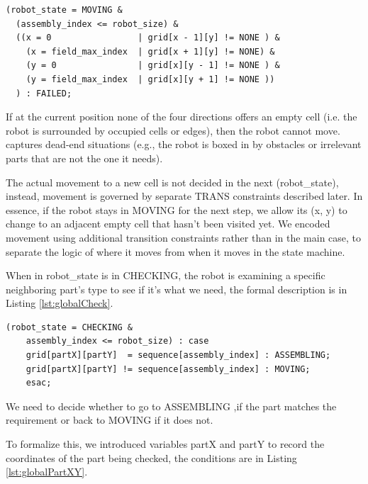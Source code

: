     \begin{lstlisting}[language=NuSMV, caption={Assign for transition MOVING to FAILED}, 
label={lse:globalMoveFail}]
  (robot_state = MOVING & 
  (assembly_index <= robot_size) & 
  ((x = 0                 | grid[x - 1][y] != NONE ) & 
    (x = field_max_index  | grid[x + 1][y] != NONE) & 
    (y = 0                | grid[x][y - 1] != NONE ) & 
    (y = field_max_index  | grid[x][y + 1] != NONE ))
  ) : FAILED;
    \end{lstlisting}

If at the current position none of the four directions offers an empty 
cell (i.e. the robot is surrounded by occupied cells or edges), then 
the robot cannot move. 
captures dead-end situations (e.g., the robot is boxed in by obstacles or 
irrelevant parts that are not the one it needs).

The actual movement to a new cell is 
not decided in the next (robot\_state), instead, movement is governed by
separate TRANS constraints described later. 
In essence, if the robot stays in MOVING for the next step, we allow 
its (x, y) to change to an adjacent empty cell that hasn’t been visited 
yet. We encoded movement using additional transition constraints rather 
than in the main case, to separate the logic of where it moves from when 
it moves in the state machine.

When in robot\_state is in CHECKING, the robot is examining a specific 
neighboring part's type to see if it's what we need, the formal description is in Listing \ref{lst:globalCheck}. 

    \begin{lstlisting}[language=NuSMV, caption={Assign for transition from CHECKING state and changing of 
        auxiliary partX and partY variables}, 
    label={lst:globalCheck}]
    (robot_state = CHECKING & 
    assembly_index <= robot_size) : case
    grid[partX][partY]  = sequence[assembly_index] : ASSEMBLING; 
    grid[partX][partY] != sequence[assembly_index] : MOVING;
    esac;
    \end{lstlisting}
We need to decide whether to go to ASSEMBLING ,if the part matches the requirement
or back to MOVING if it does not.

To formalize this, we introduced variables 
partX and partY to record the coordinates of the part being checked, the conditions are
in Listing \ref{lst:globalPartXY}. 

